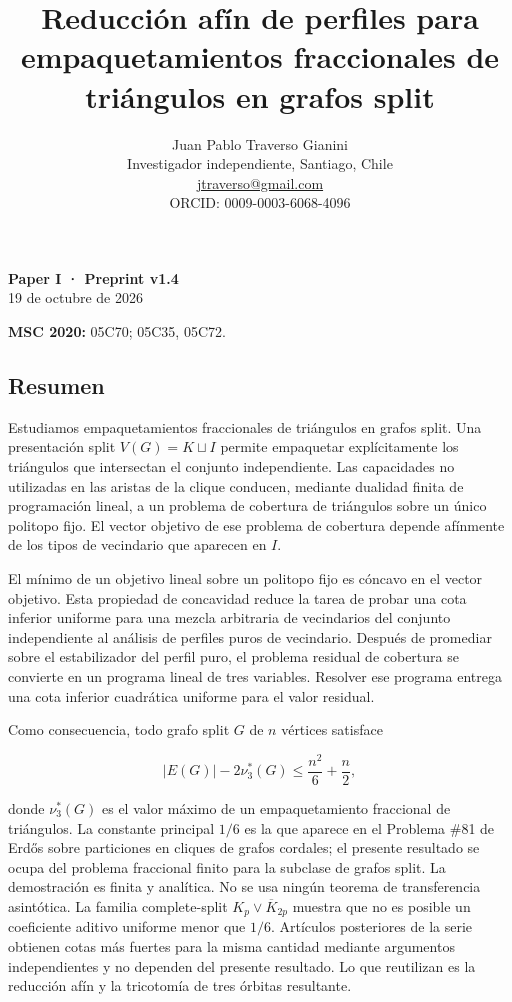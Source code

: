 \documentclass[spanish,11pt,a4paper]{article}
\title{Reducción afín de perfiles para empaquetamientos fraccionales de triángulos en grafos split}
\author{Juan Pablo Traverso Gianini\\\small Investigador independiente, Santiago, Chile\\\small \href{mailto:jtraverso@gmail.com}{jtraverso@gmail.com}\\\small ORCID: 0009-0003-6068-4096}
\date{}
\begin{document}
\raggedbottom
\maketitle
\textbf{Paper I · Preprint v1.4}\\
19 de octubre de 2026

\textbf{MSC 2020:} 05C70; 05C35, 05C72.

\subsection{Resumen}\label{resumen}

Estudiamos empaquetamientos fraccionales de triángulos en grafos split.
Una presentación split \(V(G)=K\sqcup I\) permite empaquetar
explícitamente los triángulos que intersectan el conjunto independiente.
Las capacidades no utilizadas en las aristas de la clique conducen,
mediante dualidad finita de programación lineal, a un problema de
cobertura de triángulos sobre un único politopo fijo. El vector objetivo
de ese problema de cobertura depende afínmente de los tipos de
vecindario que aparecen en \(I\).

El mínimo de un objetivo lineal sobre un politopo fijo es cóncavo en el
vector objetivo. Esta propiedad de concavidad reduce la tarea de probar
una cota inferior uniforme para una mezcla arbitraria de vecindarios del
conjunto independiente al análisis de perfiles puros de vecindario.
Después de promediar sobre el estabilizador del perfil puro, el problema
residual de cobertura se convierte en un programa lineal de tres
variables. Resolver ese programa entrega una cota inferior cuadrática
uniforme para el valor residual.

Como consecuencia, todo grafo split \(G\) de \(n\) vértices satisface

\[
\boxed{
|E(G)|-2\nu_3^*(G)\le \frac{n^2}{6}+\frac{n}{2}
},
\]

donde \(\nu_3^*(G)\) es el valor máximo de un empaquetamiento fraccional
de triángulos. La constante principal \(1/6\) es la que aparece en el
Problema \#81 de Erdős sobre particiones en cliques de grafos cordales;
el presente resultado se ocupa del problema fraccional finito para la
subclase de grafos split. La demostración es finita y analítica. No se
usa ningún teorema de transferencia asintótica. La familia
complete-split \(K_p\vee\overline{K}_{2p}\) muestra que no es posible un
coeficiente aditivo uniforme menor que \(1/6\). Artículos posteriores de
la serie obtienen cotas más fuertes para la misma cantidad mediante
argumentos independientes y no dependen del presente resultado. Lo que
reutilizan es la reducción afín y la tricotomía de tres órbitas
resultante.
\end{document}
